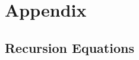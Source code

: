 \documentclass[12pt]{article}
\begin{document}

\setcounter{equation}{0}
\renewcommand{\theequation}{S.\arabic{equation}}
\setcounter{figure}{0}
\renewcommand{\thefigure}{S.\arabic{figure}}
\setcounter{table}{0}
\renewcommand{\thetable}{S.\arabic{table}}

\newpage

\section*{Appendix}

\subsection*{Recursion Equations}
\label{app:recurs}
\end{document}
